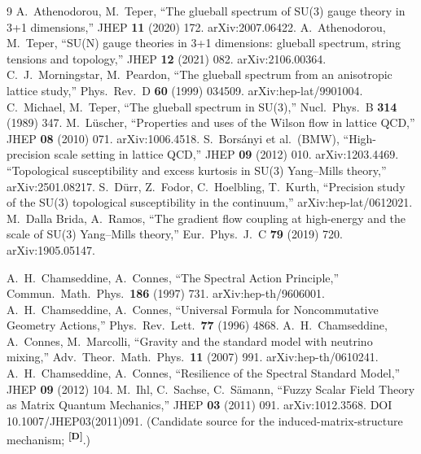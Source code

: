 \documentclass[12pt,a4paper,twoside]{article}
\theoremstyle{plain}
\theoremstyle{definition}
\theoremstyle{remark}
\newcommand{\catmark}[1]{\textsuperscript{\textsf{\textbf{[#1]}}}}
\begin{document}
\begin{thebibliography}{9}
A.~Athenodorou, M.~Teper, ``The glueball spectrum of SU(3) gauge theory in 3+1 dimensions,'' JHEP \textbf{11} (2020) 172. arXiv:2007.06422.
A.~Athenodorou, M.~Teper, ``SU(N) gauge theories in 3+1 dimensions: glueball spectrum, string tensions and topology,'' JHEP \textbf{12} (2021) 082. arXiv:2106.00364.
C.~J.~Morningstar, M.~Peardon, ``The glueball spectrum from an anisotropic lattice study,'' Phys.\ Rev.\ D \textbf{60} (1999) 034509. arXiv:hep-lat/9901004.
C.~Michael, M.~Teper, ``The glueball spectrum in SU(3),'' Nucl.\ Phys.\ B \textbf{314} (1989) 347.
M.~L\"uscher, ``Properties and uses of the Wilson flow in lattice QCD,'' JHEP \textbf{08} (2010) 071. arXiv:1006.4518.
S.~Bors\'anyi et al.\ (BMW), ``High-precision scale setting in lattice QCD,'' JHEP \textbf{09} (2012) 010. arXiv:1203.4469.
``Topological susceptibility and excess kurtosis in SU(3) Yang--Mills theory,'' arXiv:2501.08217.
S.~D\"urr, Z.~Fodor, C.~Hoelbling, T.~Kurth, ``Precision study of the SU(3) topological susceptibility in the continuum,'' arXiv:hep-lat/0612021.
M.~Dalla Brida, A.~Ramos, ``The gradient flow coupling at high-energy and the scale of SU(3) Yang--Mills theory,'' Eur.\ Phys.\ J.\ C \textbf{79} (2019) 720. arXiv:1905.05147.

A.~H.~Chamseddine, A.~Connes, ``The Spectral Action Principle,'' Commun.\ Math.\ Phys.\ \textbf{186} (1997) 731. arXiv:hep-th/9606001.
A.~H.~Chamseddine, A.~Connes, ``Universal Formula for Noncommutative Geometry Actions,'' Phys.\ Rev.\ Lett.\ \textbf{77} (1996) 4868.
A.~H.~Chamseddine, A.~Connes, M.~Marcolli, ``Gravity and the standard model with neutrino mixing,'' Adv.\ Theor.\ Math.\ Phys.\ \textbf{11} (2007) 991. arXiv:hep-th/0610241.
A.~H.~Chamseddine, A.~Connes, ``Resilience of the Spectral Standard Model,'' JHEP \textbf{09} (2012) 104.
M.~Ihl, C.~Sachse, C.~S\"amann, ``Fuzzy Scalar Field Theory as Matrix Quantum Mechanics,'' JHEP \textbf{03} (2011) 091. arXiv:1012.3568. DOI 10.1007/JHEP03(2011)091. (Candidate source for the induced-matrix-structure mechanism; \catmark{D}.)


\end{thebibliography}
\end{document}
